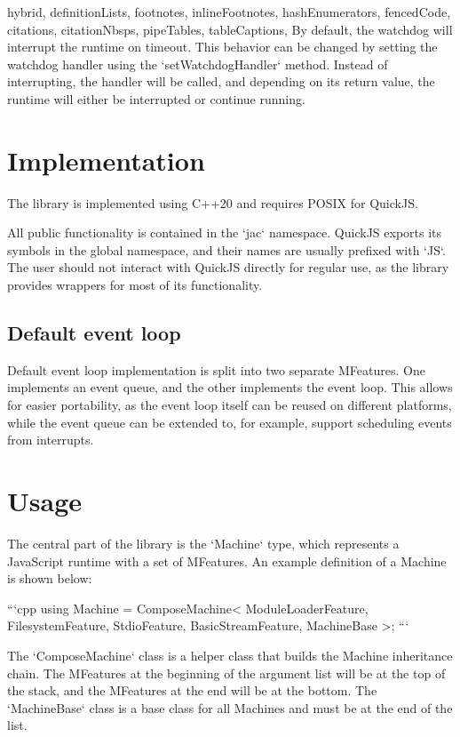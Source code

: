 \begin{markdown*}{%
  hybrid,
  definitionLists,
  footnotes,
  inlineFootnotes,
  hashEnumerators,
  fencedCode,
  citations,
  citationNbsps,
  pipeTables,
  tableCaptions,
}
By default, the watchdog will interrupt the runtime on timeout. This behavior can be changed by setting the watchdog handler using the `setWatchdogHandler` method. Instead of interrupting, the handler will be called, and depending on its return value, the runtime will either be interrupted or continue running.


\section{Implementation}

The library is implemented using C++20 and requires POSIX for QuickJS.

All public functionality is contained in the `jac` namespace. QuickJS exports its symbols in the global namespace, and their names are usually prefixed with `JS`. The user should not interact with QuickJS directly for regular use, as the library provides wrappers for most of its functionality.

\subsection{Default event loop}

Default event loop implementation is split into two separate MFeatures. One implements an event queue, and the other implements the event loop. This allows for easier portability, as the event loop itself can be reused on different platforms, while the event queue can be extended to, for example, support scheduling events from interrupts.


\section{Usage} \label{sec:machine-usage}

The central part of the library is the `Machine` type, which represents a JavaScript runtime with a set of MFeatures. An example definition of a Machine is shown below:

```cpp
using Machine = ComposeMachine<
    ModuleLoaderFeature,
    FilesystemFeature,
    StdioFeature,
    BasicStreamFeature,
    MachineBase
>;
```

The `ComposeMachine` class is a helper class that builds the Machine inheritance chain. The MFeatures at the beginning of the argument list will be at the top of the stack, and the MFeatures at the end will be at the bottom. The `MachineBase` class is a base class for all Machines and must be at the end of the list.


\end{markdown*}
